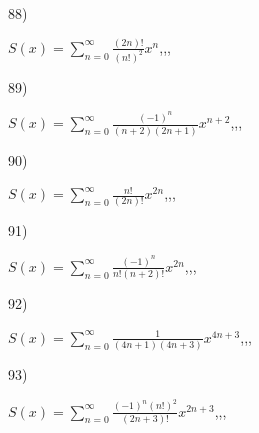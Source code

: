 \documentclass[11pt, ukrainian]{article}
\begin{document}
\par
\vspace{0.9cm}
88) \space 
{%
{$S(x)=\sum\limits_{n=0}^{\infty}{\frac{(2n)!}{(n!)^2}}{x^{n}}$},,, \par \smallskip  
}
\par
\vspace{0.9cm}
89) \space 
{%
{$S(x)=\sum\limits_{n=0}^{\infty}{\frac{(-1)^n}{(n+2)(2n+1)}}{x^{{n+2}}}$},,, \par \smallskip  
}
\par
\vspace{0.9cm}
90) \space 
{%
{$S(x)=\sum\limits_{n=0}^{\infty}{\frac{n!}{(2n)!}}{x^{{2n}}}$},,, \par \smallskip  
}
\par
\newpage
91) \space 
{%
{$S(x)=\sum\limits_{n=0}^{\infty}{\frac{(-1)^n}{n!(n+2)!}}{x^{{2n}}}$},,, \par \smallskip  
}
\par
\vspace{0.9cm}
92) \space 
{%
{$S(x)=\sum\limits_{n=0}^{\infty}{\frac{1}{(4n+1)(4n+3)}}{x^{{4n+3}}}$},,, \par \smallskip  
}
\par
\vspace{0.9cm}
93) \space 
{%
{$S(x)=\sum\limits_{n=0}^{\infty}{\frac{{(-1)^n}{(n!)^2}}{(2n+3)!}}{x^{{2n+3}}}$},,, \par \smallskip  
}
\end{document}
